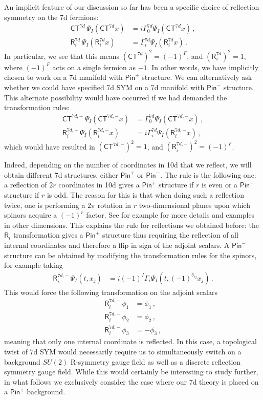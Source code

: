 \documentclass[12pt]{article}%
\numberwithin{equation}{section}
\newcommand{\al}[1]{\begin{align}#1\end{align}}
\renewcommand{\(}{\left(}
\renewcommand{\)}{\right)}
\renewcommand{\[}{\left[}
\renewcommand{\]}{\right]}
\begin{document}
An implicit feature of our discussion so far has been a specific choice of reflection symmetry on the 7d fermions:
\begin{align}
\mathsf{CT}^{7d}\,  \Psi_I(\mathsf{CT}^{7d} x) &= i\Gamma^{7d}_0 \Psi_I(\mathsf{CT}^{7d} x)\,,\\
\mathsf{R}^{7d}_i\,  \Psi_I(\mathsf{R}^{7d}_i x) &= \Gamma^{7d}_i \Psi_I(\mathsf{R}^{7d}_i x)\,.
\end{align}
In particular, we see that this means $(\mathsf{CT}^{7d})^2 = (-1)^{F}$, and $(\mathsf{R}^{7d}_{i})^2 = 1$,
where $(-1)^F$ acts on a single fermion as $-1$. In other words, we have implicitly chosen to work on a 7d manifold
with $\mathsf{Pin}^{+}$ structure. We can alternatively ask whether we could have specified 7d SYM on a 7d manifold
with $\mathsf{Pin}^{-}$ structure. This alternate possibility would have occurred if we had demanded the transformation rules:
\begin{align}
\mathsf{CT}^{7d,-}\,  \Psi_I(\mathsf{CT}^{7d,-} x) &= \Gamma^{7d}_0 \Psi_I(\mathsf{CT}^{7d,-} x)\,,\\
\mathsf{R}^{7d,-}_i\,  \Psi_I(\mathsf{R}^{7d,-}_i x) &= i\Gamma^{7d}_i \Psi_I(\mathsf{R}^{7d,-}_i x)\,,
\end{align}
which would have resulted in $(\mathsf{CT}^{7d,-})^2 = 1$, and $(\mathsf{R}^{7d,-}_{i})^2 = (-1)^F$.

Indeed, depending on the number of coordinates in 10d that we reflect, we will obtain
different 7d structures, either $\mathsf{Pin}^+$ or $\mathsf{Pin}^-$.
The rule is the following one: a reflection of $2r$ coordinates in 10d gives a $\mathsf{Pin}^+$ structure
if $r$ is even or a $\mathsf{Pin}^-$ structure if $r$ is odd. The reason for this is that when
doing such a reflection twice, one is performing a $2 \pi$ rotation in $r$ two-dimensional planes
upon which spinors acquire a $(-1)^r$ factor. See for example \cite{Montero:2020icj} for more
details and examples in other dimensions. This explains the rule for reflections we obtained before:
the $\mathsf{R}_i$ transformation gives a $\mathsf{Pin}^+$ structure thus requiring the reflection
of all internal coordinates and therefore a flip in sign of the adjoint scalars.
A $\mathsf{Pin}^-$ structure can be obtained by modifying the transformation rules for the spinors,
for example taking
%
\al{\mathsf{R}^{7d,-}_i\,  \Psi_I(t, x_j) &= i (-1)^{I} \Gamma_i \Psi_I(t,(-1)^{\delta_{ij}}x_j)\,.
}
%
This would force the following transformation on the adjoint scalars
%
\al{ \mathsf{R}^{7d,-}_i \,\phi_1 &= \phi_1\,,\\
\mathsf{R}^{7d,-}_i \,\phi_2 &= \phi_2\,,\\
\mathsf{R}^{7d,-}_i\,\phi_3 &= -\phi_3\,,
}
%
meaning that only one internal coordinate is reflected. In this case, a topological twist of 7d SYM would necessarily
require us to simultaneously switch on a background $SU(2)$ R-symmetry gauge field as well as a discrete reflection symmetry gauge field.
While this would certainly be interesting to study further, in what follows we exclusively consider the case where our 7d theory is placed on a
$\mathsf{Pin}^+$ background.
\end{document}
